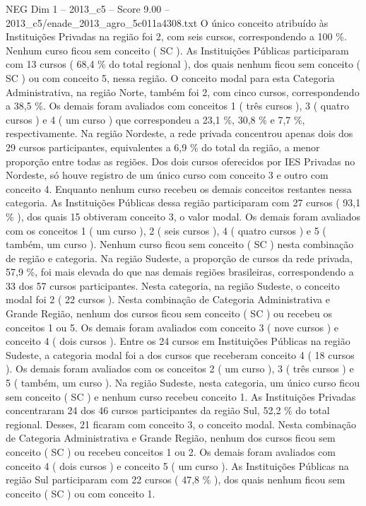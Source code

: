 \begin{textsample}{NEG Dim 1 – 2013\_c5 – Score 9.00 – 2013\_c5/enade\_2013\_agro\_5c011a4308.txt}
O único conceito atribuído às Instituições Privadas na região foi 2, com seis cursos, correspondendo a 100 \%.
Nenhum curso ficou sem conceito ( SC ).
As Instituições Públicas participaram com 13 cursos ( 68,4 \% do total regional ), dos quais nenhum ficou sem conceito ( SC ) ou com conceito 5, nessa região.
O conceito modal para esta Categoria Administrativa, na região Norte, também foi 2, com cinco cursos, correspondendo a 38,5 \%.
Os demais foram avaliados com conceitos 1 ( três cursos ), 3 ( quatro cursos ) e 4 ( um curso ) que correspondeu a 23,1 \%, 30,8 \% e 7,7 \%, respectivamente.
Na região Nordeste, a rede privada concentrou apenas dois dos 29 cursos participantes, equivalentes a 6,9 \% do total da região, a menor proporção entre todas as regiões.
Dos dois cursos oferecidos por IES Privadas no Nordeste, só houve registro de um único curso com conceito 3 e outro com conceito 4.
Enquanto nenhum curso recebeu os demais conceitos restantes nessa categoria.
As Instituições Públicas dessa região participaram com 27 cursos ( 93,1 \% ), dos quais 15 obtiveram conceito 3, o valor modal.
Os demais foram avaliados com os conceitos 1 ( um curso ), 2 ( seis cursos ), 4 ( quatro cursos ) e 5 ( também, um curso ).
Nenhum curso ficou sem conceito ( SC ) nesta combinação de região e categoria.
Na região Sudeste, a proporção de cursos da rede privada, 57,9 \%, foi mais elevada do que nas demais regiões brasileiras, correspondendo a 33 dos 57 cursos participantes.
Nesta categoria, na região Sudeste, o conceito modal foi 2 ( 22 cursos ).
Nesta combinação de Categoria Administrativa e Grande Região, nenhum dos cursos ficou sem conceito ( SC ) ou recebeu os conceitos 1 ou 5.
Os demais foram avaliados com conceito 3 ( nove cursos ) e conceito 4 ( dois cursos ).
Entre os 24 cursos em Instituições Públicas na região Sudeste, a categoria modal foi a dos cursos que receberam conceito 4 ( 18 cursos ).
Os demais foram avaliados com os conceitos 2 ( um curso ), 3 ( três cursos ) e 5 ( também, um curso ).
Na região Sudeste, nesta categoria, um único curso ficou sem conceito ( SC ) e nenhum curso recebeu conceito 1.
As Instituições Privadas concentraram 24 dos 46 cursos participantes da região Sul, 52,2 \% do total regional.
Desses, 21 ficaram com conceito 3, o conceito modal.
Nesta combinação de Categoria Administrativa e Grande Região, nenhum dos cursos ficou sem conceito ( SC ) ou recebeu conceitos 1 ou 2.
Os demais foram avaliados com conceito 4 ( dois cursos ) e conceito 5 ( um curso ).
As Instituições Públicas na região Sul participaram com 22 cursos ( 47,8 \% ), dos quais nenhum ficou sem conceito ( SC ) ou com conceito 1.

\end{textsample}
